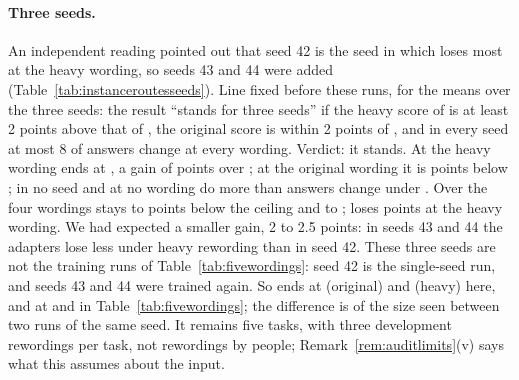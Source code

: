 \paragraph{Three seeds.} An independent reading pointed out that seed 42 is the seed in which \cert{} loses most at the heavy wording, so seeds 43 and 44 were added (Table~\ref{tab:instanceroutesseeds}).
Line fixed before these runs, for the means over the three seeds: the result ``stands for three seeds'' if the heavy score of \recog{} is at least 2 points above that of \cert{}, the original score is within 2 points of \cert{}, and in every seed at most 8 of \AudUCompared{} answers change at every wording.
Verdict: it stands. At the heavy wording \recog{} ends at \AudUThreeHeavyRidgeAP{}, a gain of \AudUThreeHeavyRidgeAboveCert{} points over \cert{}; at the original wording it is \AudUThreeOriginalRidgeBelowCert{} points below \cert{}; in no seed and at no wording do more than \AudUThreeMaxChangedPerSeed{} answers change under \recog{}. Over the four wordings \recog{} stays \AudUThreeRidgeBelowOwnLow{} to \AudUThreeRidgeBelowOwnHigh{} points below the ceiling and \handicap{} \AudUThreeHandicapBelowOwnLow{} to \AudUThreeHandicapBelowOwnHigh{}; \cert{} loses \AudUThreeHeavyCertBelowOwn{} points at the heavy wording.
We had expected a smaller gain, 2 to 2.5 points: in seeds 43 and 44 the adapters lose less under heavy rewording than in seed 42.
These three seeds are not the training runs of Table~\ref{tab:fivewordings}: seed 42 is the single-seed run, and seeds 43 and 44 were trained again. So \cert{} ends at \AudUThreeOriginalCertAPOne{} (original) and \AudUThreeHeavyCertAPOne{} (heavy) here, and at \FiveCertAP{} and \FiveCertAPHeavy{} in Table~\ref{tab:fivewordings}; the difference is of the size seen between two runs of the same seed.
It remains five tasks, with three development rewordings per task, not rewordings by people; Remark~\ref{rem:auditlimits}(v) says what this assumes about the input.

\begin{table}[t]
  \caption{As Table~\ref{tab:instanceroutes}, means over \AudUThreeSeeds{} seeds (42, 43, 44); changed answers are summed over the seeds. Training runs: seed 42 as in Table~\ref{tab:instanceroutes}, seeds 43 and 44 trained for this table; they are not the runs of Table~\ref{tab:fivewordings}, so the rows of \cert{} differ from it by a few tenths of a point.}
  \label{tab:instanceroutesseeds}
  \centering
  
\end{table}

